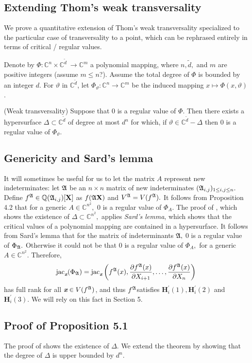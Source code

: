 \documentclass[sigconf]{acmart}
\def\xb{\textit{\textbf{x}}}
\def\C{\mathbb{C}}
\def\vt{\vartheta}
\def\jac{ \textrm{jac}}
\def\dt{\widetilde{d}}
\def\pa{\partial}
\def\A{\frak{A}}
\begin{document}
\subsection{Extending Thom's weak transversality}
%
We prove a quantitative extension of Thom's weak transversality \cite{TWT} specialized to the particular case of transversality to a point, which can be rephrased entirely in terms of critical / regular values.
\par 
Denote by $\Phi :\C^n \times \C^{\dt} ~ \rightarrow \C^{m}$
a polynomial mapping, where $n,\dt,$ and $m$ are positive integers (assume $m \leq n$?). Assume the total degree of $\Phi$ is bounded by an integer $d$. For $\vt$ in $\C^{\dt}$, let $\Phi_{\vt} : \C^n \rightarrow \C^{m}$ be the induced mapping $x\mapsto \Phi(x,\vt)$.
%
\begin{theorem} (Weak transversality)
Suppose that $0$ is a regular value of $\Phi$. Then there exists a hypersurface $\Delta \subset \C^{\dt}$ of degree at most $d^n$ for which, if $\vt \in \C^{\dt}-\Delta$ then $0$ is a regular value of $\Phi_{\vt}$. 
\end{theorem}
%
\subsection{Genericity and Sard's lemma}
%
It will sometimes be useful for us to let the matrix $A$ represent new indeterminates: let $\A$ be an $n \times n$ matrix of new indeterminates $(\A_{i,j})_{1 \leq i , j \leq n}.$ Define $f^{\A} \in \mathbb{Q}(\A_{i,j})[\textbf{X}]$ as $f(\A\textbf{X})$ and $V^\A=V(f^\A).$ It follows from Proposition 4.2 that for a generic $A \in \C^{n^2},$ $0$ is a regular value of $\Phi_{A}$.  The proof of \cite[Theorem B.3]{NO}, which shows the existence of $\Delta \subset \C^{n^2},$ applies \textit{Sard's lemma}, which shows that the critical values of a polynomial mapping are contained in a hypersurface. It follows from Sard's lemma that for the matrix of indeterminants $\A,$ $0$ is a regular value of $\Phi_{\A}.$ Otherwise it could not be that $0$ is a regular value of $\Phi_A,$ for a generic $A\in \C^{n^2}.$ Therefore,
\[
\jac_{\xb}(\Phi_{\A}) = \jac_{\xb}\left(f^{\A}(x),\frac{\pa f^{\A}(x)}{\pa X_{i+1}},\hdots,\frac{\pa f^{\A}(x)}{\pa X_n}\right)
\]
has full rank for all $\xb \in V(f^{\A})$, and thus $f^{\A}$satisfies $\textbf{H}_i^{'}(1),\textbf{H}_i^{'}(2)$ and $\textbf{H}_i^{'}(3)$. We will rely on this fact in Section 5. 
%
\subsection{Proof of Proposition 5.1}
% 
The proof of \cite[Theorem B.3]{TWT} shows the existence of $\Delta.$ We extend the theorem by showing that the degree of $\Delta$ is upper bounded by $d^n.$ 
%
\end{document}

